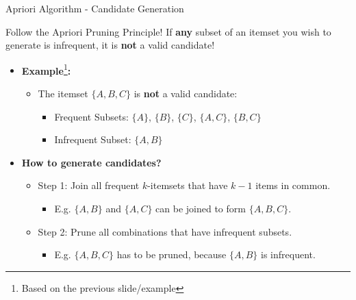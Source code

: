 \begin{frame}{Apriori Algorithm - Candidate Generation}
	\begin{alertblock}{Follow the Apriori Pruning Principle!}
		If \textbf{any} subset of an itemset you wish to generate is infrequent, it is \textbf{not} a valid candidate!
	\end{alertblock}

	\vspace{0.25cm}

	\begin{itemize}
		\item \textbf{Example}\footnote{Based on the previous slide/example}\textbf{:}
		      \begin{itemize}
			      \item The itemset $\{A,B,C\}$ is \textbf{not} a valid candidate:
			            \begin{itemize}
				            \item Frequent Subsets: $\{A\}$, $\{B\}$, $\{C\}$, $\{A,C\}$, $\{B,C\}$
				            \item Infrequent Subset: $\{A,B\}$
			            \end{itemize}
		      \end{itemize}
		\item \textbf{\color{airforceblue}How to generate candidates?}
		      \begin{itemize}
			      \item Step 1: Join all frequent $k$-itemsets that have $k-1$ items in
			            common.
			            \begin{itemize}
				            \item E.g. $\{A,B\}$ and $\{A,C\}$ can be joined to form $\{A,B,C\}$.
			            \end{itemize}
			      \item Step 2: Prune all combinations that have infrequent subsets.
			            \begin{itemize}
				            \item E.g. $\{A,B,C\}$ has to be pruned, because $\{A,B\}$ is infrequent.
			            \end{itemize}
		      \end{itemize}
	\end{itemize}
\end{frame}

